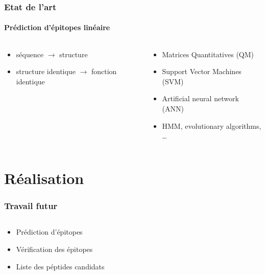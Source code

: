 \documentclass[11pt]{beamer}
\begin{document}
\begin{frame}
\frametitle{Etat de l'art}
\framesubtitle{Prédiction d'épitopes linéaire}
\begin{columns}[c]
	\begin{column}[c]{5cm}
		\begin{itemize}[<+->]
			\item séquence $\rightarrow$ structure
			\item structure identique $\rightarrow$ fonction identique
		\end{itemize}
	\end{column}
	\begin{column}[c]{5cm}
		\begin{itemize}[<+->]
			\item Matrices Quantitatives (QM)
			\item Support Vector Machines (SVM)
			\item Artificial neural network (ANN)
			\item HMM, evolutionary algorithms, \ldots
		\end{itemize}
	\end{column}
\end{columns}
\end{frame}

\section{Réalisation}
\begin{frame}
\frametitle{Travail futur}
\begin{columns}[c]
	\begin{column}[c]{5cm}
		\begin{itemize}[<+->]
			\item Prédiction d'épitopes
			\item Vérification des épitopes
			\item Liste des péptides candidats
		\end{itemize}
	\end{column}
	\begin{column}[c]{5cm}
		
	\end{column}
\end{columns}
\end{frame}
\end{document}
